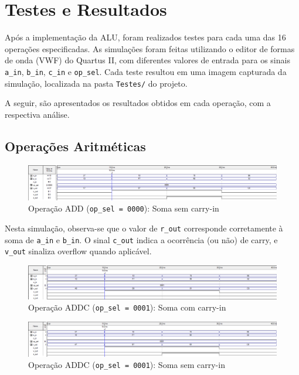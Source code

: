 \section{Testes e Resultados}

Após a implementação da ALU, foram realizados testes para cada uma das 16 operações especificadas. As simulações foram feitas utilizando o editor de formas de onda (VWF) do Quartus II, com diferentes valores de entrada para os sinais \texttt{a\_in}, \texttt{b\_in}, \texttt{c\_in} e \texttt{op\_sel}. Cada teste resultou em uma imagem capturada da simulação, localizada na pasta \texttt{Testes/} do projeto.

A seguir, são apresentados os resultados obtidos em cada operação, com a respectiva análise.

\subsection{Operações Aritméticas}

\begin{figure}[H]
\centering
\includegraphics[width=\textwidth]{images/alu_0000.png}
\caption{Operação ADD (\texttt{op\_sel = 0000}): Soma sem carry-in}
\end{figure}

Nesta simulação, observa-se que o valor de \texttt{r\_out} corresponde corretamente à soma de \texttt{a\_in} e \texttt{b\_in}. O sinal \texttt{c\_out} indica a ocorrência (ou não) de carry, e \texttt{v\_out} sinaliza overflow quando aplicável.

\begin{figure}[H]
\centering
\includegraphics[width=\textwidth]{images/alu_0001_com_carry_in.png}
\caption{Operação ADDC (\texttt{op\_sel = 0001}): Soma com carry-in}
\end{figure}

\begin{figure}[H]
\centering
\includegraphics[width=\textwidth]{images/alu_0001_sem_carry_in.png}
\caption{Operação ADDC (\texttt{op\_sel = 0001}): Soma sem carry-in}
\end{figure}

